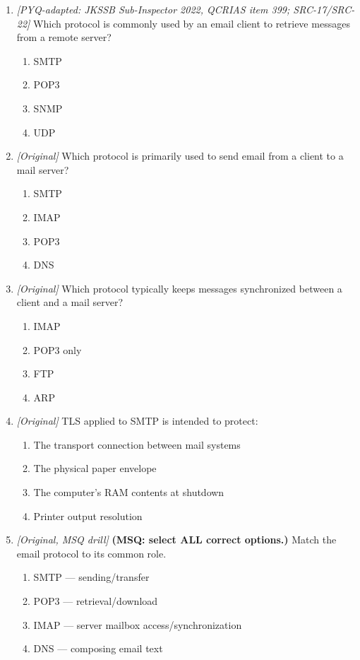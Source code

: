 \begin{enumerate}[label=\textbf{Q\arabic*.}, leftmargin=*]
\begin{enumerate}[label=\Alph*.]
    \item SMTP is used to print paper letters.
  \end{enumerate}
\item \textit{[PYQ-adapted: JKSSB Sub-Inspector 2022, QCRIAS item 399; SRC-17/SRC-22]} Which protocol is commonly used by an email client to retrieve messages from a remote server?
  \begin{enumerate}[label=\Alph*.]
\item SMTP
   \item POP3
   \item SNMP
   \item UDP
  \end{enumerate}

\item \textit{[Original]} Which protocol is primarily used to send email from a client to a mail server?
  \begin{enumerate}[label=\Alph*.]
\item SMTP
   \item IMAP
   \item POP3
   \item DNS
  \end{enumerate}

\item \textit{[Original]} Which protocol typically keeps messages synchronized between a client and a mail server?
  \begin{enumerate}[label=\Alph*.]
\item IMAP
   \item POP3 only
   \item FTP
   \item ARP
  \end{enumerate}

\item \textit{[Original]} TLS applied to SMTP is intended to protect:
  \begin{enumerate}[label=\Alph*.]
\item The transport connection between mail systems
   \item The physical paper envelope
   \item The computer's RAM contents at shutdown
   \item Printer output resolution
  \end{enumerate}

\item \textit{[Original, MSQ drill]} \textbf{(MSQ: select ALL correct options.)} Match the email protocol to its common role.
  \begin{enumerate}[label=\Alph*.]
\item SMTP --- sending/transfer
   \item POP3 --- retrieval/download
   \item IMAP --- server mailbox access/synchronization
   \item DNS --- composing email text
  \end{enumerate}

\end{enumerate}
